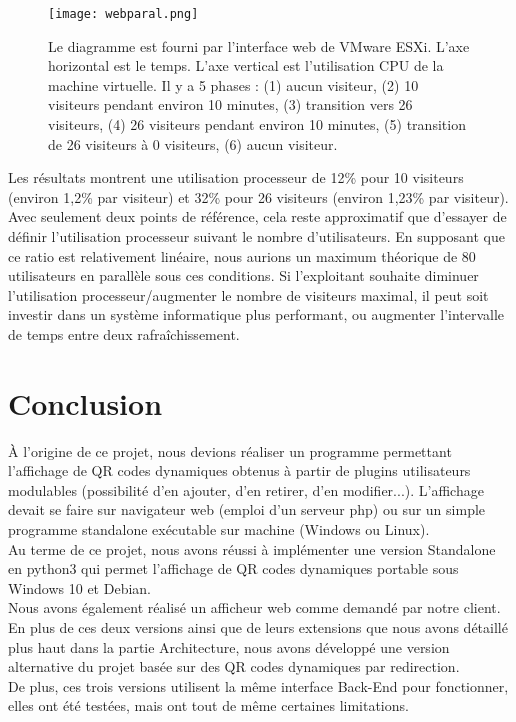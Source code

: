 \documentclass[a4paper,12pt]{article}
\begin{document}
\begin{figure}[H]
\begin{center}
  \texttt{[image: webparal.png]}
  \caption{Le diagramme est fourni par l'interface web de VMware ESXi. L'axe horizontal est le temps. L'axe vertical est l'utilisation CPU de la machine virtuelle. Il y a 5 phases : (1) aucun visiteur, (2) 10 visiteurs pendant environ 10 minutes, (3) transition vers 26 visiteurs, (4) 26 visiteurs pendant environ 10 minutes, (5) transition de 26 visiteurs à 0 visiteurs, (6) aucun visiteur.}
\end{center}
\end{figure}

\noindent Les résultats montrent une utilisation processeur de 12\% pour 10 visiteurs (environ 1,2\% par visiteur) et 32\% pour 26 visiteurs (environ 1,23\% par visiteur). Avec seulement deux points de référence, cela reste approximatif que d'essayer de définir l'utilisation processeur suivant le nombre d'utilisateurs. En supposant que ce ratio est relativement linéaire, nous aurions un maximum théorique de 80 utilisateurs en parallèle sous ces conditions. Si l'exploitant souhaite diminuer l'utilisation processeur/augmenter le nombre de visiteurs maximal, il peut soit investir dans un système informatique plus performant, ou augmenter l'intervalle de temps entre deux rafraîchissement.



\section{Conclusion}

\noindent \`A l'origine de ce projet, nous devions réaliser un programme permettant l'affichage de QR codes dynamiques obtenus à partir de plugins utilisateurs modulables (possibilité d'en ajouter, d'en retirer, d'en modifier...). L'affichage devait se faire sur navigateur web (emploi d'un serveur php) ou sur un simple programme standalone exécutable sur machine (Windows ou Linux).\\

\noindent Au terme de ce projet, nous avons réussi à implémenter une version Standalone en python3 qui permet l'affichage de QR codes dynamiques portable sous Windows 10 et Debian.\\
Nous avons également réalisé un afficheur web comme demandé par notre client.\\
En plus de ces deux versions ainsi que de leurs extensions que nous avons détaillé plus haut dans la partie Architecture, nous avons développé une version alternative du projet basée sur des QR codes dynamiques par redirection.\\
De plus, ces trois versions utilisent la même interface Back-End pour fonctionner, elles ont été testées, mais ont tout de même certaines limitations.
\end{document}
